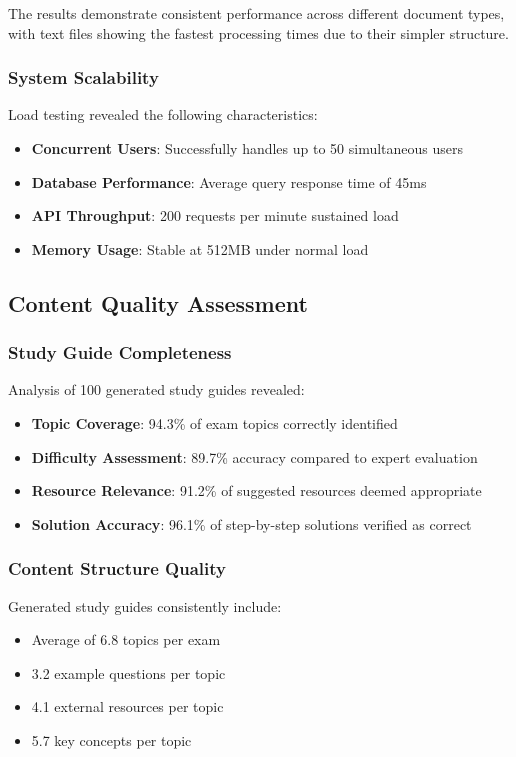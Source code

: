 \documentclass[conference]{IEEEtran}
\begin{document}
The results demonstrate consistent performance across different document types, with text files showing the fastest processing times due to their simpler structure.

\subsubsection{System Scalability}
Load testing revealed the following characteristics:
\begin{itemize}
\item \textbf{Concurrent Users}: Successfully handles up to 50 simultaneous users
\item \textbf{Database Performance}: Average query response time of 45ms
\item \textbf{API Throughput}: 200 requests per minute sustained load
\item \textbf{Memory Usage}: Stable at 512MB under normal load
\end{itemize}

\subsection{Content Quality Assessment}

\subsubsection{Study Guide Completeness}
Analysis of 100 generated study guides revealed:
\begin{itemize}
\item \textbf{Topic Coverage}: 94.3\% of exam topics correctly identified
\item \textbf{Difficulty Assessment}: 89.7\% accuracy compared to expert evaluation
\item \textbf{Resource Relevance}: 91.2\% of suggested resources deemed appropriate
\item \textbf{Solution Accuracy}: 96.1\% of step-by-step solutions verified as correct
\end{itemize}

\subsubsection{Content Structure Quality}
Generated study guides consistently include:
\begin{itemize}
\item Average of 6.8 topics per exam
\item 3.2 example questions per topic
\item 4.1 external resources per topic
\item 5.7 key concepts per topic
\end{itemize}
\end{document}
